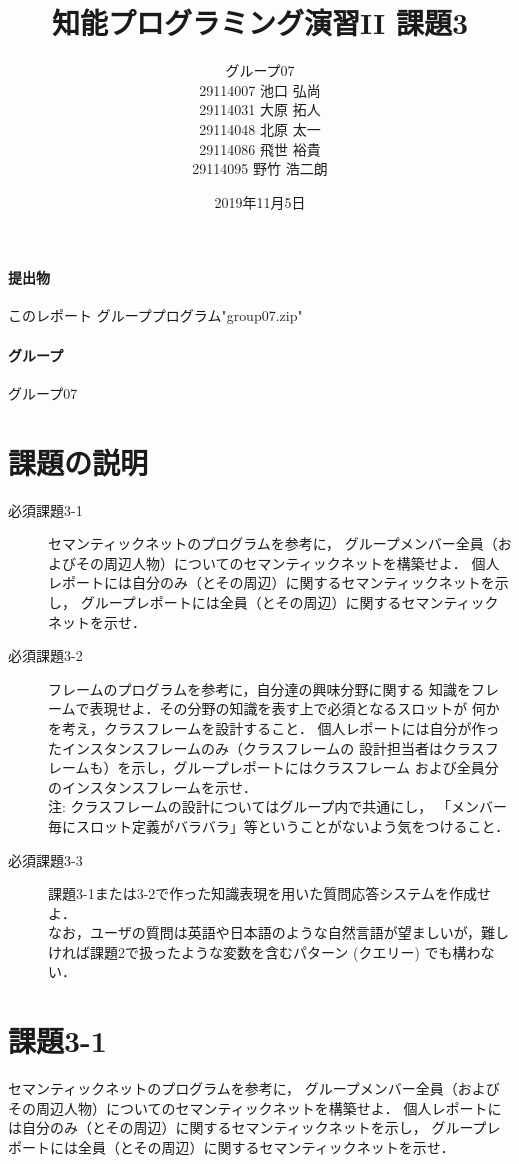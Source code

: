 \documentclass{jarticle}
\title{知能プログラミング演習II 課題3}
\author{グループ07\\
    29114007 池口 弘尚\\
    29114031 大原 拓人\\
    29114048 北原 太一\\
    29114086 飛世 裕貴\\
    29114095 野竹 浩二朗\\
}
\date{2019年11月5日}
\begin{document}
\maketitle

\paragraph{提出物} このレポート グループプログラム"group07.zip"
\paragraph{グループ} グループ07

\section{課題の説明}
\begin{description}
    \item[必須課題3-1] セマンティックネットのプログラムを参考に，
    グループメンバー全員（およびその周辺人物）についてのセマンティックネットを構築せよ．
    個人レポートには自分のみ（とその周辺）に関するセマンティックネットを示し，
    グループレポートには全員（とその周辺）に関するセマンティックネットを示せ．
    \item[必須課題3-2] フレームのプログラムを参考に，自分達の興味分野に関する
    知識をフレームで表現せよ．その分野の知識を表す上で必須となるスロットが
    何かを考え，クラスフレームを設計すること．
    個人レポートには自分が作ったインスタンスフレームのみ（クラスフレームの
    設計担当者はクラスフレームも）を示し，グループレポートにはクラスフレーム
    および全員分のインスタンスフレームを示せ．
    \\ 注: クラスフレームの設計についてはグループ内で共通にし，
    「メンバー毎にスロット定義がバラバラ」等ということがないよう気をつけること．
    \item[必須課題3-3] 課題3-1または3-2で作った知識表現を用いた質問応答システムを作成せよ．
    \\ なお，ユーザの質問は英語や日本語のような自然言語が望ましいが，難しければ課題2で扱ったような変数を含むパターン (クエリー) でも構わない． 
\end{description}


\section{課題3-1}
\begin{screen}
    セマンティックネットのプログラムを参考に，
    グループメンバー全員（およびその周辺人物）についてのセマンティックネットを構築せよ．
    個人レポートには自分のみ（とその周辺）に関するセマンティックネットを示し，
    グループレポートには全員（とその周辺）に関するセマンティックネットを示せ．
\end{screen}
\end{document}
